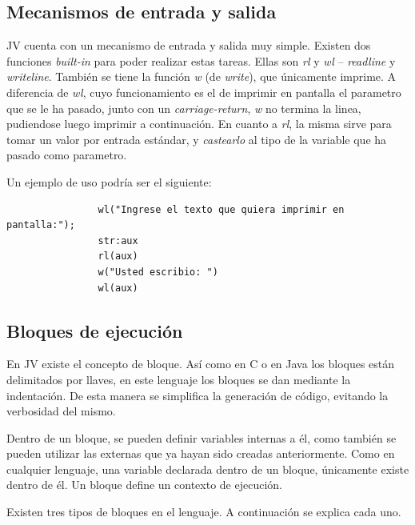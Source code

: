 \documentclass{article}
\begin{document}
        \clearpage
        
        \subsection{Mecanismos de entrada y salida}
            \par JV cuenta con un mecanismo de entrada y salida muy simple. Existen dos funciones \textit{built-in} para poder realizar estas tareas. Ellas son \textit{rl} y \textit{wl} – \textit{readline} y \textit{writeline}. También se tiene la función \textit{w} (de \textit{write}), que únicamente imprime. A diferencia de \textit{wl}, cuyo funcionamiento es el de imprimir en pantalla el parametro que se le ha pasado, junto con un \textit{carriage-return}, \textit{w} no termina la linea, pudiendose luego imprimir a continuación. En cuanto a \textit{rl}, la misma sirve para tomar un valor por entrada estándar, y \textit{castearlo} al tipo de la variable que ha pasado como parametro.
            \par Un ejemplo de uso podría ser el siguiente:

            \begin{lstlisting}
                wl("Ingrese el texto que quiera imprimir en pantalla:");
                str:aux
                rl(aux)
                w("Usted escribio: ")
                wl(aux)
            \end{lstlisting}


        \subsection{Bloques de ejecución}
            \par En JV existe el concepto de bloque. Así como en C o en Java los bloques están delimitados por llaves, en este lenguaje los bloques se dan mediante la indentación. De esta manera se simplifica la generación de código, evitando la verbosidad del mismo.
            \par Dentro de un bloque, se pueden definir variables internas a él, como también se pueden utilizar las externas que ya hayan sido creadas anteriormente. Como en cualquier lenguaje, una variable declarada dentro de un bloque, únicamente existe dentro de él. Un bloque define un contexto de ejecución.
            \par Existen tres tipos de bloques en el lenguaje. A continuación se explica cada uno.
\end{document}
